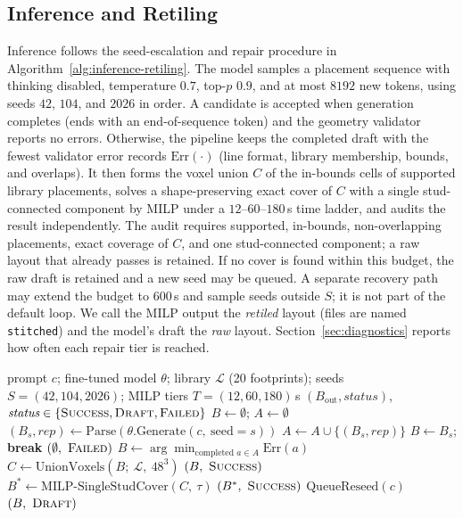 \documentclass[letterpaper]{article} %
\begin{document}
\subsection{Inference and Retiling}
Inference follows the seed-escalation and repair procedure in Algorithm~\ref{alg:inference-retiling}. The model samples a placement sequence with thinking disabled, temperature $0.7$, top-$p$ $0.9$, and at most $8192$ new tokens, using seeds $42$, $104$, and $2026$ in order. A candidate is accepted when generation completes (ends with an end-of-sequence token) and the geometry validator reports no errors. Otherwise, the pipeline keeps the completed draft with the fewest validator error records $\mathrm{Err}(\cdot)$ (line format, library membership, bounds, and overlaps). It then forms the voxel union $C$ of the in-bounds cells of supported library placements, solves a shape-preserving exact cover of $C$ with a single stud-connected component by MILP under a $12$--$60$--$180$\,s time ladder, and audits the result independently. The audit requires supported, in-bounds, non-overlapping placements, exact coverage of $C$, and one stud-connected component; a raw layout that already passes is retained. If no cover is found within this budget, the raw draft is retained and a new seed may be queued. A separate recovery path may extend the budget to $600$\,s and sample seeds outside $S$; it is not part of the default loop. We call the MILP output the \emph{retiled} layout (files are named \texttt{stitched}) and the model's draft the \emph{raw} layout. Section~\ref{sec:diagnostics} reports how often each repair tier is reached.

\begin{algorithm}[t]
\caption{BrickForma inference and retiling}
\label{alg:inference-retiling}
\small
\begin{algorithmic}[1]
\REQUIRE prompt $c$; fine-tuned model $\theta$; library $\mathcal{L}$ (20 footprints); seeds $S=(42,104,2026)$; MILP tiers $T=(12,60,180)$\,s
\ENSURE $(B_{\mathrm{out}}, \textit{status})$, $\textit{status}\in\{\textsc{Success},\textsc{Draft},\textsc{Failed}\}$
\STATE $B \gets \emptyset$; $A \gets \emptyset$
  \STATE $(B_s,\textit{rep}) \gets \mathrm{Parse}(\theta.\mathrm{Generate}(c,\ \mathrm{seed}{=}s))$
  \STATE $A \gets A \cup \{(B_s,\textit{rep})\}$
    \STATE $B \gets B_s$; \textbf{break}
  \ENDIF
\ENDFOR
{}
    \RETURN $(\emptyset,\ \textsc{Failed})$
  \ENDIF
  \STATE $B \gets \arg\min_{\text{completed } a\in A} \mathrm{Err}(a)$
\ENDIF
\STATE $C \gets \mathrm{UnionVoxels}(B;\ \mathcal{L},\ 48^3)$ 
  \RETURN $(B,\ \textsc{Success})$ 
\ENDIF
{}
  \STATE $B^{*} \gets \mathrm{MILP\text{-}SingleStudCover}(C,\ \tau)$
    \RETURN $(B^{*},\ \textsc{Success})$
  \ENDIF
\ENDFOR
\STATE $\mathrm{QueueReseed}(c)$
\RETURN $(B,\ \textsc{Draft})$ 
\end{algorithmic}
\end{algorithm}
\end{document}
